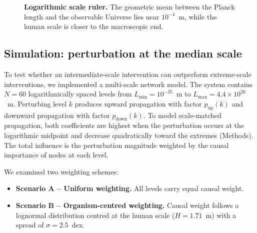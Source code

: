 \documentclass[11pt,a4paper]{article}
\begin{document}
\begin{figure}[htbp]
\centering
{}
\caption{\textbf{Logarithmic scale ruler.} The geometric mean between the Planck length and the observable Universe lies near $10^{-4}$~m, while the human scale is closer to the macroscopic end.}
\label{fig:ruler}
\end{figure}

\subsection{Simulation: perturbation at the median scale}

To test whether an intermediate-scale intervention can outperform extreme-scale interventions, we implemented a multi-scale network model. The system contains $N=60$ logarithmically spaced levels from $L_{\min}=10^{-35}$~m to $L_{\max}=4.4\times 10^{26}$~m. Perturbing level $k$ produces upward propagation with factor $p_{\mathrm{up}}(k)$ and downward propagation with factor $p_{\mathrm{down}}(k)$. To model scale-matched propagation, both coefficients are highest when the perturbation occurs at the logarithmic midpoint and decrease quadratically toward the extremes (Methods). The total influence is the perturbation magnitude weighted by the causal importance of nodes at each level.

We examined two weighting schemes:
\begin{itemize}
  \item \textbf{Scenario A -- Uniform weighting.} All levels carry equal causal weight.
  \item \textbf{Scenario B -- Organism-centred weighting.} Causal weight follows a lognormal distribution centred at the human scale ($H=1.71$~m) with a spread of $\sigma = 2.5$~dex.
\end{itemize}
\end{document}
